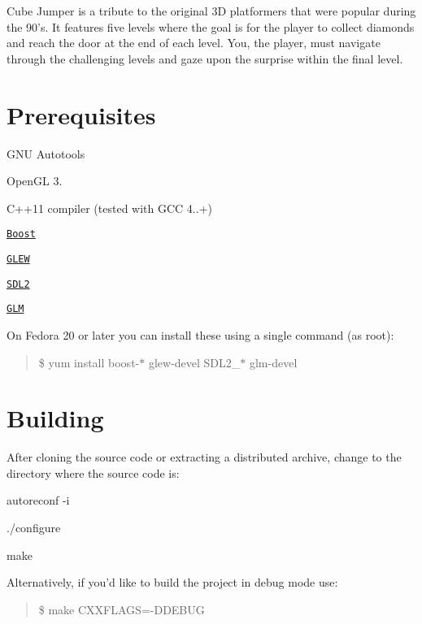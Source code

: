 Cube Jumper is a tribute to the original 3\-D platformers that were popular during the 90's. It features five levels where the goal is for the player to collect diamonds and reach the door at the end of each level. You, the player, must navigate through the challenging levels and gaze upon the surprise within the final level.

\section*{Prerequisites}


\begin{DoxyItemize}
\item G\-N\-U Autotools
\item Open\-G\-L 3.
\item C++11 compiler (tested with G\-C\-C 4..+)
\item \href{http://www.boost.org/}{\tt Boost}
\item \href{http://glew.sourceforge.net/}{\tt G\-L\-E\-W}
\item \href{https://www.libsdl.org/}{\tt S\-D\-L2}
\item \href{http://glm.g-truc.net/}{\tt G\-L\-M}
\end{DoxyItemize}

On Fedora 20 or later you can install these using a single command (as root)\-:

\begin{quotation}
\$ yum install boost-\/$\ast$ glew-\/devel S\-D\-L2\-\_\-$\ast$ glm-\/devel

\end{quotation}


\section*{Building}

After cloning the source code or extracting a distributed archive, change to the directory where the source code is\-:


\begin{DoxyItemize}
\item autoreconf -\/i
\item ./configure
\item make
\end{DoxyItemize}

Alternatively, if you'd like to build the project in debug mode use\-:

\begin{quotation}
\$ make C\-X\-X\-F\-L\-A\-G\-S=-\/\-D\-D\-E\-B\-U\-G

\end{quotation}


